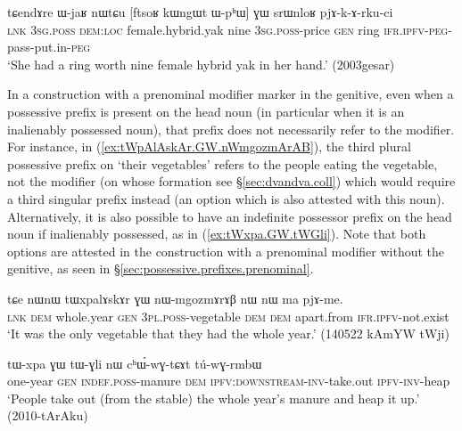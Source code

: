 \begin{exe}
\ex \label{ex:ftsoR.kWngWt.WphW}
\gll tɕendɤre ɯ-jaʁ nɯtɕu [ftsoʁ kɯngɯt ɯ-pʰɯ] ɣɯ srɯnloʁ pjɤ-k-ɤ-rku-ci \\
\textsc{lnk} \textsc{3sg}.\textsc{poss} \textsc{dem}:\textsc{loc} female.hybrid.yak nine \textsc{3sg}.\textsc{poss}-price \textsc{gen} ring \textsc{ifr}.\textsc{ipfv}-\textsc{peg}-pass-put.in-\textsc{peg} \\
\glt `She had a ring worth nine female hybrid yak in her hand.' (2003gesar)
\end{exe}

In a construction with a prenominal modifier marker in the genitive, even when a possessive prefix is present on the head noun (in particular when it is an inalienably possessed noun), that prefix does not necessarily refer to the modifier. For instance, in (\ref{ex:tWpAlAskAr.GW.nWmgozmArAB}), the third plural possessive prefix  on  `their vegetables' refers to the people eating the vegetable, not  the modifier  (on whose formation see §\ref{sec:dvandva.coll}) which would require a third singular prefix instead (an option which is also attested with this noun). Alternatively, it is also possible to have an indefinite possessor prefix on the head noun if inalienably possessed, as in (\ref{ex:tWxpa.GW.tWGli}). Note that both options are attested in the construction with a prenominal modifier without the genitive, as seen in §\ref{sec:possessive.prefixes.prenominal}.
 
 \begin{exe}
\ex \label{ex:tWpAlAskAr.GW.nWmgozmArAB}
\gll  tɕe nɯnɯ tɯxpalɤskɤr ɣɯ nɯ-mgozmɤrɤβ nɯ nɯ ma pjɤ-me.  \\
\textsc{lnk} \textsc{dem} whole.year \textsc{gen} \textsc{3pl}.\textsc{poss}-vegetable \textsc{dem} \textsc{dem} apart.from \textsc{ifr}.\textsc{ipfv}-not.exist \\
\glt `It was the only vegetable that they had the whole year.'  (140522 kAmYW tWji)
\end{exe}

\begin{exe}
\ex \label{ex:tWxpa.GW.tWGli}
\gll  tɯ-xpa ɣɯ tɯ-ɣli nɯ cʰɯ́-wɣ-tɕɤt tú-wɣ-rmbɯ  \\
one-year \textsc{gen} \textsc{indef}.\textsc{poss}-manure \textsc{dem} \textsc{ipfv}:\textsc{downstream}-\textsc{inv}-take.out \textsc{ipfv}-\textsc{inv}-heap \\
\glt `People take out (from the stable) the whole year's manure and heap it up.' (2010-tArAku)
\end{exe}

